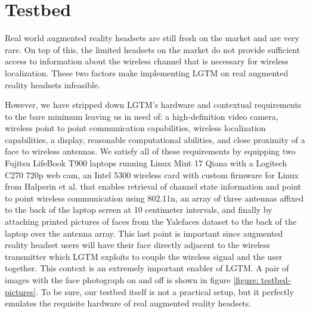 \documentclass[12pt]{report}
\begin{document}
\section{Testbed}
Real world augmented reality headsets are still fresh on the market and are very rare. On top of this, the limited headsets on the market do not provide sufficient access to information about the wireless channel that is necessary for wireless localization. These two factors make implementing LGTM on real augmented reality headsets infeasible. \par

However, we have stripped down LGTM's hardware and contextual requirements to the bare minimum leaving us in need of: a high-definition video camera, wireless point to point communication capabilities, wireless localization capabilities, a display, reasonable computational abilities, and close proximity of a face to wireless antennas. We satisfy all of these requirements by equipping two Fujitsu LifeBook T900 laptops running Linux Mint 17 Qiana with a Logitech C270 720p web cam, an Intel 5300 wireless card with custom firmware for Linux from Halperin et al. \cite{ChannelStateInformationToolReleaseHalperin2011} that enables retrieval of channel state information and point to point wireless communication using 802.11n, an array of three antennas affixed to the back of the laptop screen at 10 centimeter intervals, and finally by attaching printed pictures of faces from the Yalefaces dataset \cite{FisherfacesBelhumeur1997} to the back of the laptop over the antenna array. This last point is important since augmented reality headset users will have their face directly adjacent to the wireless transmitter which LGTM exploits to couple the wireless signal and the user together. This context is an extremely important enabler of LGTM. A pair of images with the face photograph on and off is shown in figure \ref{figure: testbed-pictures}. To be sure, our testbed itself is not a practical setup, but it perfectly emulates the requisite hardware of real augmented reality headsets. \par
\end{document}
